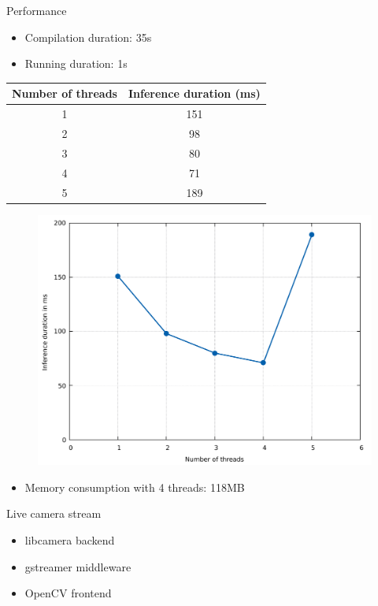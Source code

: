\begin{frame}{Performance}
  \begin{itemize}
	\item Compilation duration: 35s
	\item Running duration: 1s
  \end{itemize}
  \begin{table}
    {\tiny
	\begin{tabular}{|c|c|}
	  \hline
		\textbf{Number of threads} & \textbf{Inference duration (ms)} \\
	  \hline
		1 & 151 \\
	  \hline
		2 & 98 \\
	  \hline
		3 & 80 \\
	  \hline
		4 & 71 \\
	  \hline
		5 & 189 \\
	  \hline
	\end{tabular}
	}
  \end{table}
  \begin{figure}
	\includegraphics[width=\linewidth,height=0.5\textheight,keepaspectratio]{images/inference_duration_rps.pdf}
  \end{figure}
  \begin{itemize}
	\item Memory consumption with 4 threads: 118MB
  \end{itemize}

\end{frame}

\begin{frame}{Live camera stream}
  \begin{itemize}
	\item libcamera backend
	\item gstreamer middleware
	\item OpenCV frontend
  \end{itemize}
\end{frame}

